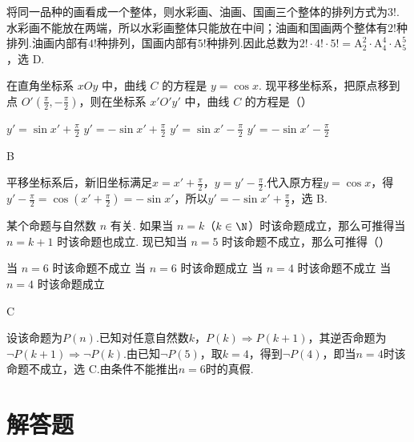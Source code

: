 \begin{solution}
将同一品种的画看成一个整体，则水彩画、油画、国画三个整体的排列方式为\(3!\).水彩画不能放在两端，所以水彩画整体只能放在中间；油画和国画两个整体有\(2!\)种排列.油画内部有\(4!\)种排列，国画内部有\(5!\)种排列.因此总数为\(2!\cdot4!\cdot5!=\mathrm A_2^2\cdot\mathrm A_4^4\cdot\mathrm A_5^5\)，选 D.
\end{solution}

\begin{problem}
在直角坐标系 \(xOy\) 中，曲线 \(C\) 的方程是 \(y = \cos x\). 现平移坐标系，把原点移到点 \(O'\left(\frac{\pi}{2}, -\frac{\pi}{2}\right)\)，则在坐标系 \(x'O'y'\) 中，曲线 \(C\) 的方程是（\quad）

\choices
    {\(y' = \sin x' + \frac{\pi}{2} \)}
    {\(y' = -\sin x' + \frac{\pi}{2} \)}
    {\(y' = \sin x' - \frac{\pi}{2} \)}
    {\(y' = -\sin x' - \frac{\pi}{2} \)}
\end{problem}

\begin{answer}
B
\end{answer}

\begin{solution}
平移坐标系后，新旧坐标满足\(x=x'+\frac{\pi}{2}\)，\(y=y'-\frac{\pi}{2}\).代入原方程\(y=\cos x\)，得\(y'-\frac{\pi}{2}=\cos\left(x'+\frac{\pi}{2}\right)=-\sin x'\)，所以\(y'=-\sin x'+\frac{\pi}{2}\)，选 B.
\end{solution}

\begin{problem}
某个命题与自然数 \(n\) 有关. 如果当 \(n = k\)（\(k \in \N\)）时该命题成立，那么可推得当 \(n = k + 1\) 时该命题也成立. 现已知当 \(n = 5\) 时该命题不成立，那么可推得（\quad）

\choices
    {当 \(n = 6\) 时该命题不成立}
    {当 \(n = 6\) 时该命题成立}
    {当 \(n = 4\) 时该命题不成立}
    {当 \(n = 4\) 时该命题成立}
\end{problem}

\begin{answer}
C
\end{answer}

\begin{solution}
设该命题为\(P(n)\).已知对任意自然数\(k\)，\(P(k)\Rightarrow P(k+1)\)，其逆否命题为\(\neg P(k+1)\Rightarrow\neg P(k)\).由已知\(\neg P(5)\)，取\(k=4\)，得到\(\neg P(4)\)，即当\(n=4\)时该命题不成立，选 C.由条件不能推出\(n=6\)时的真假.
\end{solution}

\section{解答题}

